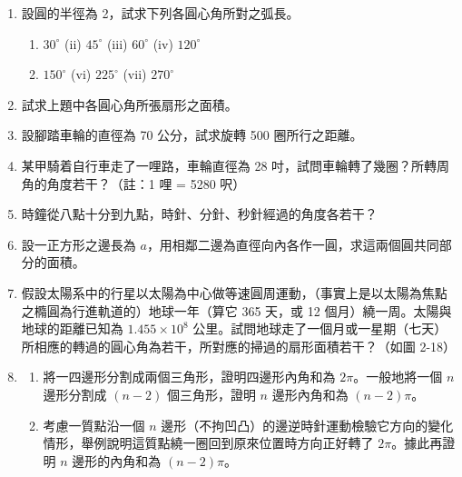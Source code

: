\begin{enumerate}[label=\arabic*., leftmargin=2em]
  \item 設圓的半徑為 2，試求下列各圓心角所對之弧長。
  \begin{enumerate}[label=(\roman*), leftmargin=2.5em]
    \item $30^\circ$ \qquad (ii) $45^\circ$ \qquad (iii) $60^\circ$ \qquad (iv) $120^\circ$
    \item[(v)] $150^\circ$ \qquad (vi) $225^\circ$ \qquad (vii) $270^\circ$
  \end{enumerate}
  \item 試求上題中各圓心角所張扇形之面積。
  \item 設腳踏車輪的直徑為 70 公分，試求旋轉 500 圈所行之距離。
  \begin{flushright}
  \end{flushright}
  \item 某甲騎着自行車走了一哩路，車輪直徑為 28 吋，試問車輪轉了幾圈？所轉周角的角度若干？（註：1 哩 = 5280 呎）
  \item 時鐘從八點十分到九點，時針、分針、秒針經過的角度各若干？
  \item 設一正方形之邊長為 $a$，用相鄰二邊為直徑向內各作一圓，求這兩個圓共同部分的面積。
  \item 假設太陽系中的行星以太陽為中心做等速圓周運動，（事實上是以太陽為焦點之橢圓為行進軌道的）地球一年（算它 365 天，或 12 個月）繞一周。太陽與地球的距離已知為 $1.455 \times 10^8$ 公里。試問地球走了一個月或一星期（七天）所相應的轉過的圓心角為若干，所對應的掃過的扇形面積若干？（如圖 2-18）
  \item 
  \begin{enumerate}[label=(\roman*), leftmargin=2.5em]
    \item 將一四邊形分割成兩個三角形，證明四邊形內角和為 $2\pi$。一般地將一個 $n$ 邊形分割成 $(n-2)$ 個三角形，證明 $n$ 邊形內角和為 $(n-2)\pi$。
    \item 考慮一質點沿一個 $n$ 邊形（不拘凹凸）的邊逆時針運動檢驗它方向的變化情形，舉例說明這質點繞一圈回到原來位置時方向正好轉了 $2\pi$。據此再證明 $n$ 邊形的內角和為 $(n-2)\pi$。
  \end{enumerate}
\end{enumerate}

